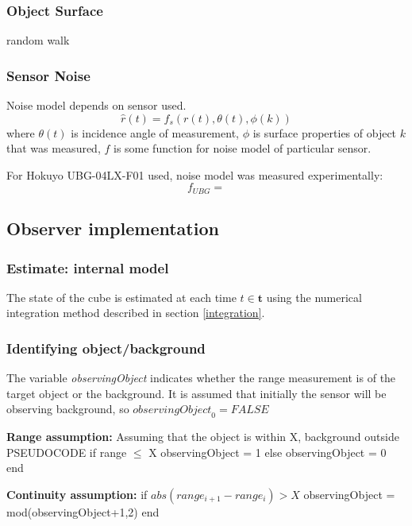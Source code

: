 	\subsubsection{Object Surface}
	random walk
	
	\subsubsection{Sensor Noise}
	Noise model depends on sensor used.
	\begin{equation}
		\hat{r}(t) = f_s(r(t),\theta(t),\phi(k))
	\end{equation}
	where $\theta(t)$ is incidence angle of measurement, $\phi$ is surface properties of object $k$ that was measured, $f$ is some function for noise model of particular sensor.
	
	For Hokuyo UBG-04LX-F01 used, noise model was measured experimentally:
	\begin{equation}
		f_{UBG} = 
	\end{equation}
	
	
\subsection{Observer implementation}
	\subsubsection{Estimate: internal model}
		The state of the cube is estimated at each time $t \in \mathbf{t}$ using the numerical integration method described in section \ref{integration}.
	
	\subsubsection{Identifying object/background}
		The variable \textit{observingObject} indicates whether the range measurement is of the target object or the background. It is assumed that initially the sensor will be observing background, so $\textit{observingObject}_0 = FALSE$

		\textbf{Range assumption:}
		Assuming that the object is within X, background outside
		PSEUDOCODE
		if range $\leq$ X
			observingObject = 1
		else
			observingObject = 0
		end
		
		\textbf{Continuity assumption:}
		if $abs(range_{i+1}-range_i) > X$
			observingObject = mod(observingObject+1,2)
		end
		
